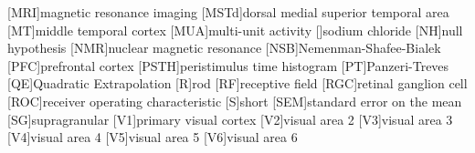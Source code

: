 \begin{acronym}[AUROC]
        [MRI]{magnetic resonance imaging}
        [MSTd]{dorsal medial superior temporal area}
        [MT]{middle temporal cortex}
        [MUA]{multi-unit activity}
        []{sodium chloride}
        [NH]{null hypothesis}
        [NMR]{nuclear magnetic resonance}
        [NSB]{{N}emenman-{S}hafee-{B}ialek}
        [PFC]{prefrontal cortex}
        [PSTH]{peristimulus time histogram}
        [PT]{{P}anzeri-{T}reves}
        [QE]{Quadratic Extrapolation}
        [R]{rod}
        [RF]{receptive field}
        [RGC]{retinal ganglion cell}
        [ROC]{receiver operating characteristic}
        [S]{short}
        [SEM]{standard error on the mean}
        [SG]{supragranular}
        [V1]{primary visual cortex}
        [V2]{visual area 2}
        [V3]{visual area 3}
        [V4]{visual area 4}
        [V5]{visual area 5}
        [V6]{visual area 6}
    \end{acronym}                     
\endgroup

\cleardoublepage
